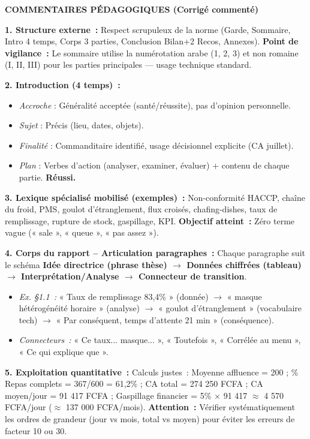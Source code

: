 \documentclass[11pt]{article}
\newcommand{\cle}[1]{{\popxbold\color{popdark}#1}}
\begin{document}
\begin{exoresolu}
\tcblower
\noindent \textbf{COMMENTAIRES PÉDAGOGIQUES (Corrigé commenté)}

\noindent \textbf{1. Structure externe~:} Respect scrupuleux de la norme (Garde, Sommaire, Intro 4 temps, Corps 3 parties, Conclusion Bilan+2 Recos, Annexes). \textbf{Point de vigilance~:} Le sommaire utilise la numérotation arabe (1, 2, 3) et non romaine (I, II, III) pour les parties principales — usage technique standard.

\noindent \textbf{2. Introduction (4 temps)~:}
\begin{itemize}
    \item \textit{Accroche} : Généralité acceptée (santé/réussite), pas d'opinion personnelle.
    \item \textit{Sujet} : Précis (lieu, dates, objets).
    \item \textit{Finalité} : Commanditaire identifié, usage décisionnel explicite (CA juillet).
    \item \textit{Plan} : Verbes d'action (analyser, examiner, évaluer) + contenu de chaque partie. \textbf{Réussi.}
\end{itemize}

\noindent \textbf{3. Lexique spécialisé mobilisé (exemples)~:} \cle{Non-conformité HACCP}, \cle{chaîne du froid}, \cle{PMS}, \cle{goulot d'étranglement}, \cle{flux croisés}, \cle{chafing-dishes}, \cle{taux de remplissage}, \cle{rupture de stock}, \cle{gaspillage}, \cle{KPI}. \textbf{Objectif atteint~:} Zéro terme vague (« sale », « queue », « pas assez »).

\noindent \textbf{4. Corps du rapport – Articulation paragraphes~:}
Chaque paragraphe suit le schéma \textbf{Idée directrice (phrase thèse) $\rightarrow$ Données chiffrées (tableau) $\rightarrow$ Interprétation/Analyse $\rightarrow$ Connecteur de transition}.
\begin{itemize}
    \item \textit{Ex. §1.1~:} « Taux de remplissage 83,4\% » (donnée) $\rightarrow$ « masque hétérogénéité horaire » (analyse) $\rightarrow$ « goulot d'étranglement » (vocabulaire tech) $\rightarrow$ « Par conséquent, temps d'attente 21 min » (conséquence).
    \item \textit{Connecteurs~:} « Ce taux... masque... », « Toutefois », « Corrélée au menu », « Ce qui explique que ».
\end{itemize}

\noindent \textbf{5. Exploitation quantitative~:}
Calculs justes~: Moyenne affluence = 200 ; \% Repas complets = 367/600 = 61,2\% ; CA total = 274 250 FCFA ; CA moyen/jour = 91 417 FCFA ; Gaspillage financier = 5\% $\times$ 91 417 $\approx$ 4 570 FCFA/jour ($\approx$ 137 000 FCFA/mois). \textbf{Attention~:} Vérifier systématiquement les ordres de grandeur (jour vs mois, total vs moyen) pour éviter les erreurs de facteur 10 ou 30.


\end{exoresolu}
\end{document}
